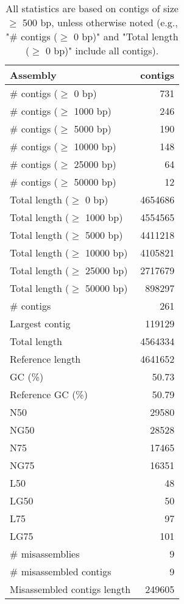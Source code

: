 \documentclass[12pt,a4paper]{article}
\begin{document}
\begin{table}[ht]
\begin{center}
\caption{All statistics are based on contigs of size $\geq$ 500 bp, unless otherwise noted (e.g., "\# contigs ($\geq$ 0 bp)" and "Total length ($\geq$ 0 bp)" include all contigs).}
\begin{tabular}{|l*{1}{|r}|}
\hline
Assembly & contigs \\ \hline
\# contigs ($\geq$ 0 bp) & 731 \\ \hline
\# contigs ($\geq$ 1000 bp) & 246 \\ \hline
\# contigs ($\geq$ 5000 bp) & 190 \\ \hline
\# contigs ($\geq$ 10000 bp) & 148 \\ \hline
\# contigs ($\geq$ 25000 bp) & 64 \\ \hline
\# contigs ($\geq$ 50000 bp) & 12 \\ \hline
Total length ($\geq$ 0 bp) & 4654686 \\ \hline
Total length ($\geq$ 1000 bp) & 4554565 \\ \hline
Total length ($\geq$ 5000 bp) & 4411218 \\ \hline
Total length ($\geq$ 10000 bp) & 4105821 \\ \hline
Total length ($\geq$ 25000 bp) & 2717679 \\ \hline
Total length ($\geq$ 50000 bp) & 898297 \\ \hline
\# contigs & 261 \\ \hline
Largest contig & 119129 \\ \hline
Total length & 4564334 \\ \hline
Reference length & 4641652 \\ \hline
GC (\%) & 50.73 \\ \hline
Reference GC (\%) & 50.79 \\ \hline
N50 & 29580 \\ \hline
NG50 & 28528 \\ \hline
N75 & 17465 \\ \hline
NG75 & 16351 \\ \hline
L50 & 48 \\ \hline
LG50 & 50 \\ \hline
L75 & 97 \\ \hline
LG75 & 101 \\ \hline
\# misassemblies & 9 \\ \hline
\# misassembled contigs & 9 \\ \hline
Misassembled contigs length & 249605 \\ \hline

\end{tabular}
\end{center}
\end{table}
\end{document}

